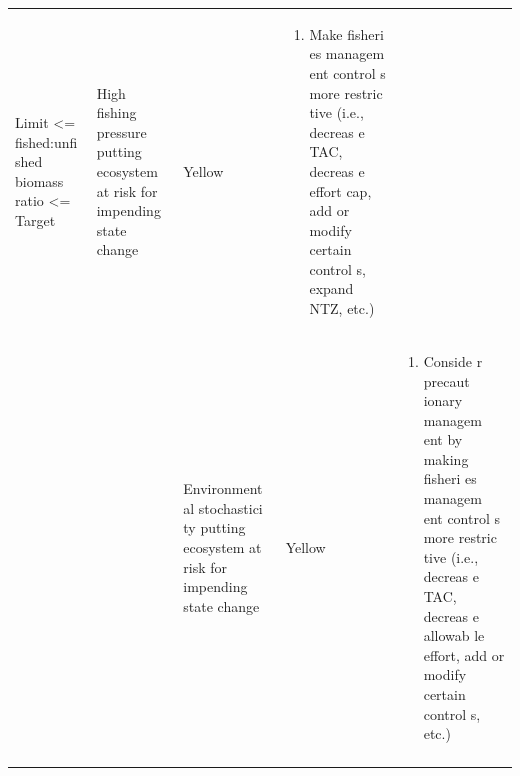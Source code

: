 \documentclass[]{book}
\providecommand{\tightlist}{%
  \setlength{\itemsep}{0pt}\setlength{\parskip}{0pt}}
\begin{document}
\begin{longtable}[]{@{}lllll@{}}
\begin{minipage}[t]{0.19\columnwidth}
Limit \textless{}= fished:unfi shed biomass ratio \textless{}=
Target\strut
\end{minipage} & \begin{minipage}[t]{0.19\columnwidth}\raggedright\strut
High fishing pressure putting ecosystem at risk for impending state
change\strut
\end{minipage} & \begin{minipage}[t]{0.19\columnwidth}\raggedright\strut
Yellow\strut
\end{minipage} & \begin{minipage}[t]{0.19\columnwidth}\raggedright\strut
\begin{enumerate}
\def\labelenumi{\arabic{enumi}.}
\tightlist
\item
  Make fisheri es managem ent control s more restric tive (i.e., decreas
  e TAC, decreas e effort cap, add or modify certain control s, expand
  NTZ, etc.)
\end{enumerate}\strut
\end{minipage}\tabularnewline
\begin{minipage}[t]{0.19\columnwidth}\raggedright\strut
\strut
\end{minipage} & \begin{minipage}[t]{0.19\columnwidth}\raggedright\strut
\strut
\end{minipage} & \begin{minipage}[t]{0.19\columnwidth}\raggedright\strut
Environment al stochastici ty putting ecosystem at risk for impending
state change\strut
\end{minipage} & \begin{minipage}[t]{0.19\columnwidth}\raggedright\strut
Yellow\strut
\end{minipage} & \begin{minipage}[t]{0.19\columnwidth}\raggedright\strut
\begin{enumerate}
\def\labelenumi{\arabic{enumi}.}
\tightlist
\item
  Conside r precaut ionary managem ent by making fisheri es managem ent
  control s more restric tive (i.e., decreas e TAC, decreas e allowab le
  effort, add or modify certain control s, etc.)
\end{enumerate}\strut
\end{minipage}\tabularnewline
\begin{minipage}[t]{0.19\columnwidth}\raggedright\strut
\strut
\end{minipage} & \begin{minipage}[t]{0.19\columnwidth}\raggedright\strut

\end{minipage}
\end{longtable}
\end{document}
